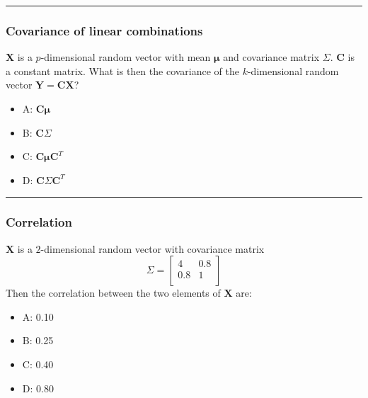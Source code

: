 \documentclass[]{article}
\providecommand{\tightlist}{%
  \setlength{\itemsep}{0pt}\setlength{\parskip}{0pt}}
\begin{document}
\begin{center}\rule{0.5\linewidth}{\linethickness}\end{center}

\hypertarget{covariance-of-linear-combinations}{%
\subsubsection{Covariance of linear
combinations}\label{covariance-of-linear-combinations}}

\(\mathbf{X}\) is a \(p\)-dimensional random vector with mean
\(\mathbf{\mu}\) and covariance matrix \(\Sigma\). \(\mathbf{C}\) is a
constant matrix. What is then the covariance of the \(k\)-dimensional
random vector \(\mathbf{Y}=\mathbf{C}\mathbf{X}\)?

\begin{itemize}
\tightlist
\item
  A: \(\mathbf{C}\mathbf{\mu}\)
\item
  B: \(\mathbf{C}\Sigma\)
\item
  C: \(\mathbf{C}\mathbf{\mu}\mathbf{C}^T\)
\item
  D: \(\mathbf{C}\Sigma\mathbf{C}^T\)
\end{itemize}

\begin{center}\rule{0.5\linewidth}{\linethickness}\end{center}

\hypertarget{correlation}{%
\subsubsection{Correlation}\label{correlation}}

\(\mathbf{X}\) is a \(2\)-dimensional random vector with covariance
matrix \[ \Sigma= \left[\begin{array}{cc}
          4 & 0.8 \\
          0.8 & 1\\
      \end{array}
    \right]\] Then the correlation between the two elements of
\(\mathbf{X}\) are:

\begin{itemize}
\tightlist
\item
  A: 0.10
\item
  B: 0.25
\item
  C: 0.40
\item
  D: 0.80
\end{itemize}
\end{document}
